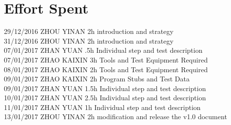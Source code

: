 \documentclass{article}
\begin{document}
\section{Effort Spent}
29/12/2016 ZHOU YINAN 2h introduction and strategy\\
31/12/2016 ZHOU YINAN 2h introduction and strategy\\
07/01/2017 ZHAN YUAN .5h Individual step and test description\\
07/01/2017	ZHAO KAIXIN 3h Tools and Test Equipment Required\\
08/01/2017	ZHAO KAIXIN 2h Tools and Test Equipment Required\\
09/01/2017	ZHAO KAIXIN 2h Program Stubs and Test Data\\
09/01/2017 ZHAN YUAN 1.5h Individual step and test description\\
10/01/2017 ZHAN YUAN 2.5h Individual step and test description\\
11/01/2017	ZHAN YUAN 1h  Individual step and test description\\
13/01/2017	ZHOU YINAN 2h modification and release the v1.0 document
\end{document}
